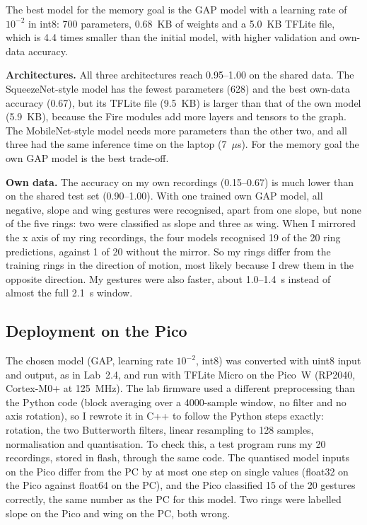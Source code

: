 \documentclass[conference]{IEEEtran}
\begin{document}
The best model for the memory goal is the GAP model with a learning rate of
$10^{-2}$ in int8: 700 parameters, 0.68~KB of weights and a 5.0~KB TFLite
file, which is 4.4 times smaller than the initial model, with higher
validation and own-data accuracy.

\textbf{Architectures.} All three architectures reach 0.95--1.00 on the
shared data. The SqueezeNet-style model has the fewest parameters (628) and
the best own-data accuracy (0.67), but its TFLite file (9.5~KB) is larger
than that of the own model (5.9~KB), because the Fire modules add more
layers and tensors to the graph. The MobileNet-style model needs more
parameters than the other two, and all three had the same inference time
on the laptop (7~$\mu$s). For the memory goal the own
GAP model is the best trade-off.

\textbf{Own data.} The accuracy on my own recordings (0.15--0.67) is much
lower than on the shared test set (0.90--1.00). With one trained own GAP model,
all negative, slope and wing gestures were recognised, apart from one
slope, but none of the five rings: two were classified as slope and three
as wing. When I mirrored the x axis of my ring recordings, the four models
recognised 19 of the 20 ring predictions, against 1 of 20 without the
mirror. So my rings differ from the training rings in the direction of
motion, most likely because I drew them in the opposite direction. My
gestures were also faster, about 1.0--1.4~s instead of almost the full
2.1~s window.

\subsection{Deployment on the Pico}\label{sec:pico}
The chosen model (GAP, learning rate $10^{-2}$, int8) was converted with
uint8 input and output, as in Lab~2.4, and run with TFLite Micro on the
Pico~W (RP2040, Cortex-M0+ at 125~MHz). The lab firmware used a different
preprocessing than the Python code (block averaging over a 4000-sample
window, no filter and no axis rotation), so I rewrote it in C++ to follow
the Python steps exactly: rotation, the two Butterworth filters, linear
resampling to 128 samples, normalisation and quantisation. To check this, a
test program runs my 20 recordings, stored in flash, through the same code.
The quantised model inputs on the Pico differ from the PC by at most one
step on single values (float32 on the Pico against float64 on the PC), and
the Pico classified 15 of the 20 gestures correctly, the same number as the
PC for this model. Two rings were labelled slope on the Pico and wing on
the PC, both wrong.
\end{document}
